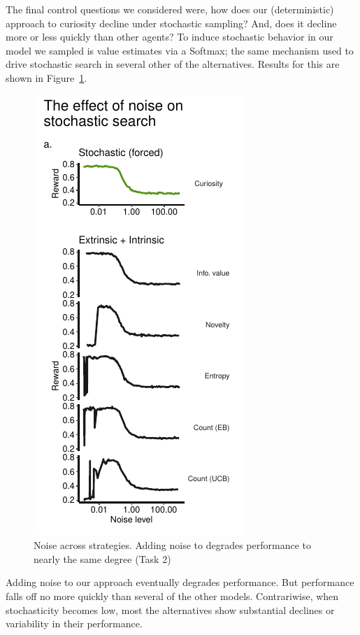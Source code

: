 The final control questions we considered were, how does our (deterministic) approach to curiosity decline under stochastic sampling? And, does it decline more or less quickly than other agents? To induce stochastic behavior in our model we sampled is value estimates via a Softmax; the same mechanism used to drive stochastic search in several other of the alternatives. Results for this are shown in Figure~\ref{fig:forced2}.

\begin{figure}
	\includegraphics[width=0.4\linewidth]{img/forced2.pdf} 
	\caption{Noise across strategies. Adding noise to degrades performance to nearly the same degree (Task 2)}
	\label{fig:forced2}
\end{figure}

Adding noise to our approach eventually degrades performance. But performance  falls off no more quickly than several of the other models. Contrariwise, when stochasticity becomes low, most the alternatives show substantial declines or variability in their performance. 
